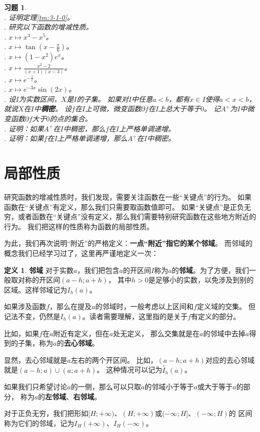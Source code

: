 \documentclass[12pt,UTF8]{ctexbook}
\theoremstyle{definition}
\newtheorem{df}{定义}[section]
\theoremstyle{plain}
\newtheorem{xt}{习题}[section]
\begin{document}
\begin{xt}
    \mbox{} \\
    . 证明定理\ref{tm:3-1-0}。\\
    . 研究以下函数的增减性质。\\
    . $x\mapsto x^3 - x^5$。\\
    . $x\mapsto \tan{\left(x - \frac{\pi}{6}\right)}$。\\
    . $x\mapsto (1 - x^2) e^x$。\\
    . $x\mapsto \frac{x^2 - 2}{(x + 1)(x - 3)}$。\\
    . $x\mapsto e^{-\frac{1}{x}}$。\\
    . $x\mapsto e^{-3x} \sin{(2x)}$。\\
    . 设$I$为实数区间，$X$是$I$的子集。
    如果对$I$中任意$a < b$，都有$x\in I$使得$a<x<b$，就说$X$在$I$中\textbf{稠密}。
    设$f$在$I$上可微，微变函数$\partial f$在$I$上总大于等于$0$。
    记$A^+$为$I$中微变函数$\partial f$大于$0$的点的集合。\\
    . 证明：如果$A^+$在$I$中稠密，那么$f$在$I$上严格单调递增。\\
    . 证明：如果$f$在$I$上严格单调递增，那么$A^+$在$I$中稠密。
    
\end{xt}


 \section{局部性质}

研究函数的增减性质时，我们发现，需要关注函数在一些“关键点”的行为。
如果函数在“关键点”有定义，那么我们只需要取函数值即可。
如果“关键点”是正负无穷，或者函数在“关键点”没有定义，那么我们需要特别研究函数在这些地方附近的行为。
我们把这样的性质称为函数的局部性质。

为此，我们再次说明“附近”的严格定义：\textbf{一点“附近”指它的某个邻域}。
而邻域的概念我们已经学习过了，这里再严谨地定义一次：
\begin{df}{\textbf{邻域}}
    对于实数$a$，我们把包含$a$的开区间$I$称为$a$的\textbf{邻域}。为了方便，我们一般取对称的开区间$(a-h; a+h)$，
    其中$h>0$是足够小的实数，以免涉及到别的区域。这样邻域记为$I_h(a)$。

    如果涉及函数$f$，那么在提及$a$的邻域时，一般考虑以上区间和$f$定义域的交集。
    但记法不变，仍然是$I_h(a)$。读者需要理解，这里指的是关于$f$有定义的部分。

    比如，如果$f$在$a$附近有定义，但在$a$处无定义，
    那么交集就是在$a$的邻域中去掉$a$得到的子集，称为$a$的\textbf{去心邻域}。

    显然，去心邻域就是$a$左右的两个开区间。
    比如，$(a-h; a+h)$对应的去心邻域就是$(a-h; a)\cup(a; a+h)$。
    这种情况可以记为$\overset{\circ}{I}_h(a)$。

    如果我们只希望讨论$a$的一侧，那么可以只取$a$的邻域小于等于$a$或大于等于$a$的部分，
    称为$a$的\textbf{左邻域}、\textbf{右邻域}。

    对于正负无穷，我们把形如$[H; +\infty)$、$(H; +\infty)$或$(-\infty; H]$、$(-\infty; H)$的
    区间称为它们的邻域，记为$I_H(+\infty)$、$I_H(-\infty)$。
\end{df}
\end{document}
